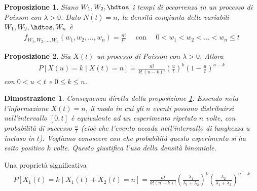 \documentclass{article}
\newtheorem{proposizione}{Proposizione}[section]
\newtheorem*{dimostrazione*}{Dimostrazione}
\begin{document}
\begin{proposizione}
\label{pp_dens_congiunta_variabili}
Siano $W_1,W_2,\hdtos$ i tempi di occorrenza in un processo di Poisson con $\lambda > 0$. Dato $N(t) =n$, la densità congiunta delle variabili $W_1,W_2,\hdtos,W_n$ è
\begin{align*}
f_{W_1,W_2,...,W_n}(w_1,w_2,\hdots,w_n) = \frac{n!}{t^n}\quad\text{ con }\quad 0<w_1<w_2<\hdots<w_n\le t
\end{align*}
\end{proposizione}

\begin{boxedminipage}{\textwidth}
\begin{proposizione}
\label{pp_prob_condizionata_binomiale}
Sia $X(t)$ un processo di Poisson con $\lambda > 0$. Allora
\begin{gather}
P[X(u) = k \mid X(t) = n] = \frac{n!}{k!\,(n-k)!} \left(\frac{u}{t}\right)^k\left(1-\frac{u}{t}\right)^{n-k}
\end{gather}
con $0<u<t$ e $0\le k \le n$.
\end{proposizione}
\begin{dimostrazione*}
Conseguenza diretta della proposizione \ref{pp_dens_congiunta_variabili}. Essendo nota l'informazione $X(t) = n$, il modo in cui gli $n$ eventi possono distribuirsi nell'intervallo $[0,t]$ è equivalente ad un esperimento ripetuto $n$ volte, con probabilità di successo $\frac{u}{t}$ (cioè che l'evento accada nell'intervallo di lunghezza $u$ incluso in $t$). Vogliamo conoscere con che probabilità questo esperimento si ha esito positivo $k$ volte. Questo giustifica l'uso della densità binomiale. 
\end{dimostrazione*}

Una proprietà significativa
\begin{align}
P[X_1(t) = k \mid X_1(t) + X_2(t) = n] = \frac{n!}{k!(n-k)!}\left(\frac{\lambda_1}{\lambda_1+\lambda_2}\right)^k\left(\frac{\lambda_2}{\lambda_1+\lambda_2}\right)^{n-k}
\end{align}
\end{boxedminipage}
\bigbreak
\end{document}
